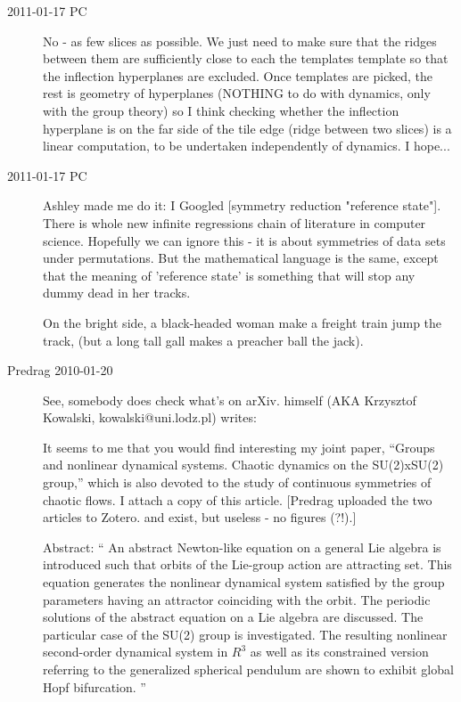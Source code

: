 \begin{description}
\item[2011-01-17 PC]  No - as few slices as possible. We just need
to make sure that the ridges between them are sufficiently close
to each the templates template so that the inflection hyperplanes
are excluded. Once templates are picked, the rest is geometry of
hyperplanes (NOTHING to do with dynamics, only with the group theory)
so I think checking whether the inflection hyperplane is on
the far side of the tile edge (ridge between two slices)
is a linear computation, to be undertaken independently of dynamics. I hope...


\item[2011-01-17 PC] Ashley made me do it: I Googled [symmetry reduction
"reference state"]. There is whole new infinite regressions chain of
literature in computer science. Hopefully we can ignore
this - it is about symmetries of data sets under permutations. But the
mathematical language is the same, except that the meaning of 'reference
state' is something that will stop any dummy dead in her tracks.

On the bright side,
a black-headed woman make a freight train
{jump the track},
(but a long tall gall makes a preacher ball the jack).


  \item[Predrag 2010-01-20] See, somebody does check what's on arXiv.
himself (AKA Krzysztof Kowalski, kowalski@uni.lodz.pl)
writes:

It seems to me
that you would find interesting my joint paper,
``Groups and nonlinear
dynamical systems. Chaotic dynamics on the SU(2)xSU(2) group,''
which is also devoted to the study of continuous symmetries
of chaotic flows.  I attach a copy of this article.
[Predrag uploaded the two articles to Zotero.
 and
 exist,
but useless - no figures (?!).]

Abstract: ``
An abstract Newton-like equation on a general Lie algebra is introduced
such that orbits of the Lie-group action are attracting set. This
equation generates the nonlinear dynamical system satisfied by the group
parameters having an attractor coinciding with the orbit. The periodic
solutions of the abstract equation on a Lie algebra are discussed. The
particular case of the SU(2) group is investigated. The resulting
nonlinear second-order dynamical system in $R^3$ as well as its
constrained version referring to the generalized spherical pendulum are
shown to exhibit global Hopf bifurcation.
''


\end{description}

